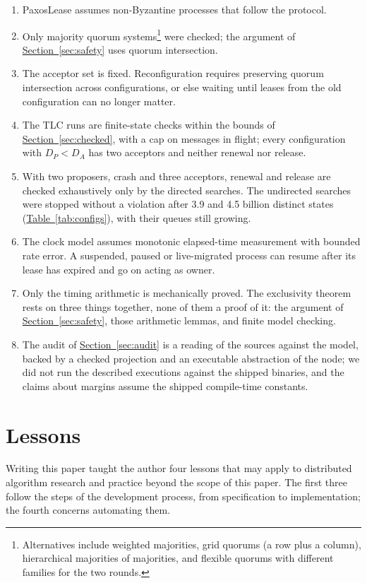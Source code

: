 \documentclass[final,5p,times,twocolumn,number]{elsarticle}
\newcommand{\secref}[1]{\hyperref[#1]{Section~\ref*{#1}}}
\newcommand{\tabref}[1]{\hyperref[#1]{Table~\ref*{#1}}}
\begin{document}
\begin{enumerate}\itemsep0.25em
\item PaxosLease assumes non-Byzantine processes that follow the protocol.
\item Only majority quorum systems\footnote{Alternatives include weighted majorities, grid quorums (a row plus a column), hierarchical majorities of majorities, and flexible quorums with different families for the two rounds.} were checked; the argument of \secref{sec:safety} uses quorum intersection.
\item The acceptor set is fixed.  Reconfiguration requires preserving quorum intersection across configurations, or else waiting until leases from the old configuration can no longer matter.
\item The TLC runs are finite-state checks within the bounds of \secref{sec:checked}, with a cap on messages in flight; every configuration with $D_P < D_A$ has two acceptors and neither renewal nor release.
\item With two proposers, crash and three acceptors, renewal and release are checked exhaustively only by the directed searches.  The undirected searches were stopped without a violation after 3.9 and 4.5 billion distinct states (\tabref{tab:configs}), with their queues still growing.
\item The clock model assumes monotonic elapsed-time measurement with bounded rate error.  A suspended, paused or live-migrated process can resume after its lease has expired and go on acting as owner.
\item Only the timing arithmetic is mechanically proved.  The exclusivity theorem rests on three things together, none of them a proof of it: the argument of \secref{sec:safety}, those arithmetic lemmas, and finite model checking.
\item The audit of \secref{sec:audit} is a reading of the sources against the model, backed by a checked projection and an executable abstraction of the node; we did not run the described executions against the shipped binaries, and the claims about margins assume the shipped compile-time constants.
\end{enumerate}

\section{Lessons}\label{sec:lessons}

Writing this paper taught the author four lessons that may apply to distributed algorithm research and practice beyond the scope of this paper.  The first three follow the steps of the development process, from specification to implementation; the fourth concerns automating them.
\end{document}

